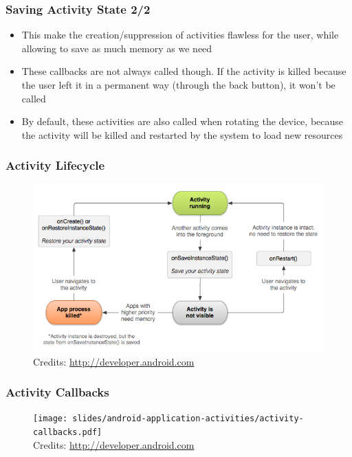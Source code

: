 \begin{frame}
  \frametitle{Saving Activity State 2/2}
  \begin{itemize}
  \item This make the creation/suppression of activities flawless for
    the user, while allowing to save as much memory as we need
  \item These callbacks are not always called though. If the activity
    is killed because the user left it in a permanent way (through the
    back button), it won't be called
  \item By default, these activities are also called when rotating the device,
    because the activity will be killed and restarted by the system to
    load new resources
  \end{itemize}
\end{frame}

\begin{frame}
  \frametitle{Activity Lifecycle}
  \begin{figure}[h!]
    \centering
    \includegraphics[width=\textwidth]{slides/android-application-activities/activity-saving.png}\\
    {
      \tiny
      Credits: \url{http://developer.android.com}
    }
  \end{figure}
\end{frame}

\begin{frame}
  \frametitle{Activity Callbacks}
  \begin{figure}[h!]
    \centering
    \texttt{[image: slides/android-application-activities/activity-callbacks.pdf]}\\
    {
      \tiny
      Credits: \url{http://developer.android.com}
    }
  \end{figure}
\end{frame}

